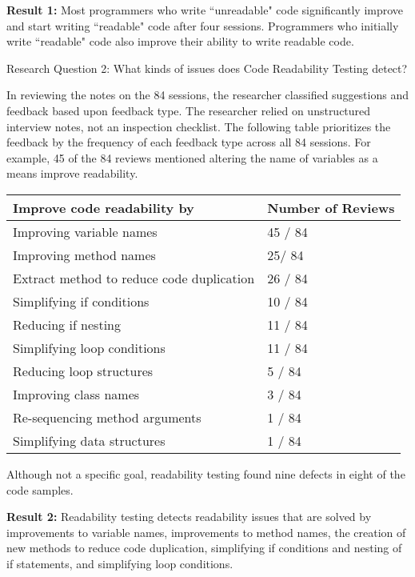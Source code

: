 \documentclass[conference]{IEEEtran}
\begin{document}
\textbf{Result 1:} Most programmers who write ``unreadable" code significantly improve and start writing ``readable" code after four sessions. Programmers who initially write ``readable" code also improve their ability to write readable code.

Research Question 2: What kinds of issues does Code Readability Testing detect?

In reviewing the notes on the 84 sessions, the researcher classified suggestions and feedback based upon feedback type. The researcher relied on unstructured interview notes, not an inspection checklist. The following table prioritizes the feedback by the frequency of each feedback type across all 84 sessions. For example, 45 of the 84 reviews mentioned altering the name of variables as a means improve readability.

\begin{table}[!t]
\renewcommand{\arraystretch}{1.3}
\centering
\begin{tabular}{l||l}
\hline
\bfseries Improve code readability by & \bfseries Number of Reviews\\
\hline\hline
Improving variable names                  & 45 / 84           \\ \hline
Improving method names                    & 25/ 84            \\ \hline
Extract method to reduce code duplication & 26 / 84           \\ \hline
Simplifying if conditions                 & 10 / 84           \\ \hline
Reducing if nesting                       & 11 / 84           \\ \hline
Simplifying loop conditions               & 11 / 84           \\ \hline
Reducing loop structures                  & 5 / 84            \\ \hline
Improving class names                     & 3 / 84            \\ \hline
Re-sequencing method arguments            & 1 / 84            \\ \hline
Simplifying data structures               & 1 / 84            \\ \hline
\end{tabular}
\end{table}

Although not a specific goal, readability testing found nine defects in eight of the code samples.

\textbf{Result 2:} Readability testing detects readability issues that are solved by improvements to variable names, improvements to method names, the creation of new methods to reduce code duplication, simplifying if conditions and nesting of if statements, and simplifying loop conditions.
\end{document}
